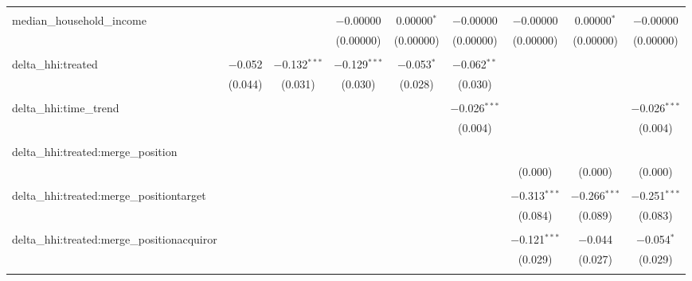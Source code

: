 \begin{table}[H]
{\begin{tabular}{@{\extracolsep{5pt}}lcccccccc}
   & & & & & & & & \\  

  median\_household\_income &  &  & $-$0.00000 & 0.00000$^{*}$ & $-$0.00000 & $-$0.00000 & 0.00000$^{*}$ & $-$0.00000 \\  

   &  &  & (0.00000) & (0.00000) & (0.00000) & (0.00000) & (0.00000) & (0.00000) \\  

   & & & & & & & & \\  

  delta\_hhi:treated & $-$0.052 & $-$0.132$^{***}$ & $-$0.129$^{***}$ & $-$0.053$^{*}$ & $-$0.062$^{**}$ &  &  &  \\  

   & (0.044) & (0.031) & (0.030) & (0.028) & (0.030) &  &  &  \\  

   & & & & & & & & \\  

  delta\_hhi:time\_trend &  &  &  &  & $-$0.026$^{***}$ &  &  & $-$0.026$^{***}$ \\  

   &  &  &  &  & (0.004) &  &  & (0.004) \\  

   & & & & & & & & \\  

  delta\_hhi:treated:merge\_position &  &  &  &  &  &  &  &  \\  

   &  &  &  &  &  & (0.000) & (0.000) & (0.000) \\  

   & & & & & & & & \\  

  delta\_hhi:treated:merge\_positiontarget &  &  &  &  &  & $-$0.313$^{***}$ & $-$0.266$^{***}$ & $-$0.251$^{***}$ \\  

   &  &  &  &  &  & (0.084) & (0.089) & (0.083) \\  

   & & & & & & & & \\  

  delta\_hhi:treated:merge\_positionacquiror &  &  &  &  &  & $-$0.121$^{***}$ & $-$0.044 & $-$0.054$^{*}$ \\  

   &  &  &  &  &  & (0.029) & (0.027) & (0.029) \\  

   & & & & & & & & \\  


\end{tabular}}
\end{table}
